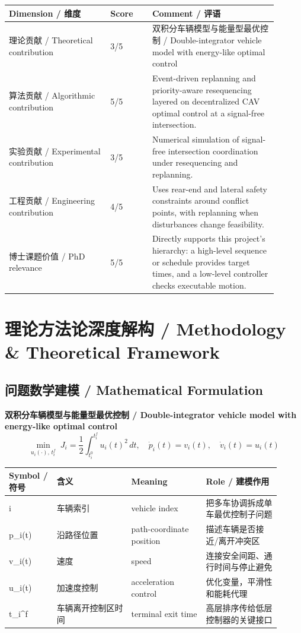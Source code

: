 \documentclass[UTF8,a4paper,11pt,fontset=fandol]{ctexart}
\begin{document}
\begin{longtable}{p{0.34\linewidth}p{0.14\linewidth}p{0.42\linewidth}}
\toprule
Dimension / 维度 & Score & Comment / 评语\\
\midrule
理论贡献 / Theoretical contribution & 3/5 & 双积分车辆模型与能量型最优控制 / Double-integrator vehicle model with energy-like optimal control \\
算法贡献 / Algorithmic contribution & 5/5 & Event-driven replanning and priority-aware resequencing layered on decentralized CAV optimal control at a signal-free intersection. \\
实验贡献 / Experimental contribution & 3/5 & Numerical simulation of signal-free intersection coordination under resequencing and replanning. \\
工程贡献 / Engineering contribution & 4/5 & Uses rear-end and lateral safety constraints around conflict points, with replanning when disturbances change feasibility. \\
博士课题价值 / PhD relevance & 5/5 & Directly supports this project's hierarchy: a high-level sequence or schedule provides target times, and a low-level controller checks executable motion. \\
\bottomrule
\end{longtable}

\section{理论方法论深度解构 / Methodology \& Theoretical Framework}
\subsection{问题数学建模 / Mathematical Formulation}
\textbf{双积分车辆模型与能量型最优控制 / Double-integrator vehicle model with energy-like optimal control}
\[
\min_{u_i(\cdot),\,t_i^f}\; J_i=\frac{1}{2}\int_{t_i^0}^{t_i^f}u_i(t)^2\,dt,\quad \dot p_i(t)=v_i(t),\quad \dot v_i(t)=u_i(t)
\]
\begin{longtable}{p{0.16\linewidth}p{0.25\linewidth}p{0.25\linewidth}p{0.25\linewidth}}
\toprule
Symbol / 符号 & 含义 & Meaning & Role / 建模作用\\
\midrule
i & 车辆索引 & vehicle index & 把多车协调拆成单车最优控制子问题 \\
p\_i(t) & 沿路径位置 & path-coordinate position & 描述车辆是否接近/离开冲突区 \\
v\_i(t) & 速度 & speed & 连接安全间距、通行时间与停止避免 \\
u\_i(t) & 加速度控制 & acceleration control & 优化变量，平滑性和能耗代理 \\
t\_i\textasciicircum{}f & 车辆离开控制区时间 & terminal exit time & 高层排序传给低层控制器的关键接口 \\
\bottomrule
\end{longtable}
\end{document}
